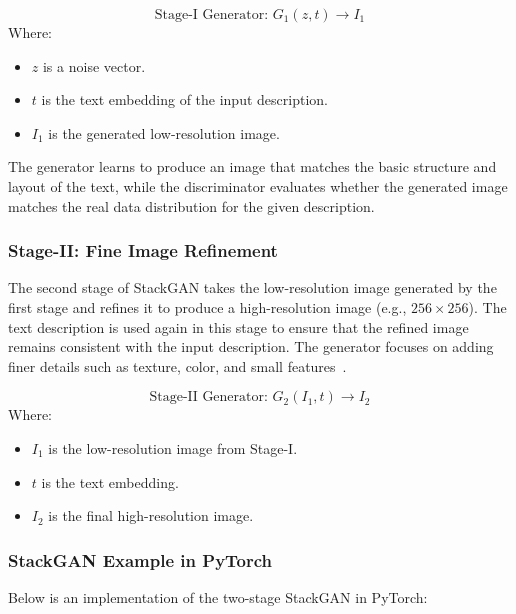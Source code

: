\[
\text{Stage-I Generator: } G_1(z, t) \rightarrow I_1
\]
Where:
\begin{itemize}
    \item \( z \) is a noise vector.
    \item \( t \) is the text embedding of the input description.
    \item \( I_1 \) is the generated low-resolution image.
\end{itemize}

The generator learns to produce an image that matches the basic structure and layout of the text, while the discriminator evaluates whether the generated image matches the real data distribution for the given description.

\subsubsection{Stage-II: Fine Image Refinement}

The second stage of StackGAN takes the low-resolution image generated by the first stage and refines it to produce a high-resolution image (e.g., \(256 \times 256\)). The text description is used again in this stage to ensure that the refined image remains consistent with the input description. The generator focuses on adding finer details such as texture, color, and small features~\cite{zhang2017stackgan}.

\[
\text{Stage-II Generator: } G_2(I_1, t) \rightarrow I_2
\]
Where:
\begin{itemize}
    \item \( I_1 \) is the low-resolution image from Stage-I.
    \item \( t \) is the text embedding.
    \item \( I_2 \) is the final high-resolution image.
\end{itemize}

\subsubsection{StackGAN Example in PyTorch}

Below is an implementation of the two-stage StackGAN in PyTorch:

